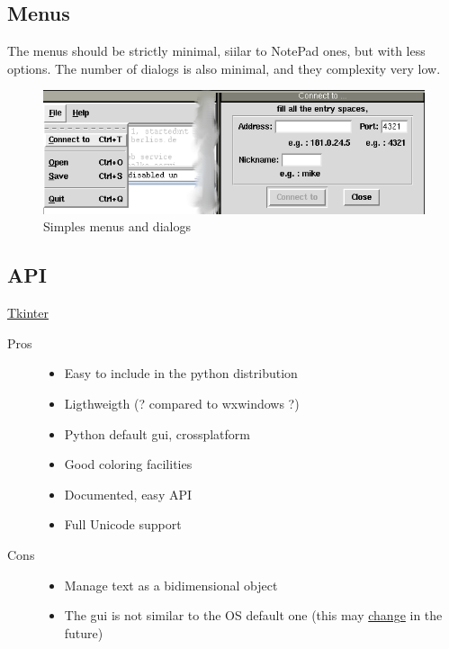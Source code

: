 \documentclass{article}
\begin{document}
\subsection{Menus}

The menus should be strictly minimal, siilar to NotePad ones, but with less options.
The number of dialogs is also minimal, and they complexity very low.


\begin{figure}[htbp]
 \begin{center}
    \includegraphics[angle=0,width=0.5\linewidth]{schemas/simples_menus_and_dialogs.png}
 \end{center}
 \label{fig:simplesmenusanddialogs}
 \caption{Simples menus and dialogs}
\end{figure}


\subsection{API}

\href{http://www.python.org/topics/tkinter/}{Tkinter}

\begin{description}
\item [Pros]
    \begin{itemize}
    \item Easy to include in the python distribution
    \item Ligthweigth (? compared to wxwindows ?)
    \item Python default gui, crossplatform
    \item Good coloring facilities
    \item Documented, easy API
    \item Full Unicode support
    \end{itemize}

\item [Cons]
    \begin{itemize}
    \item Manage text as a bidimensional object
    \item The gui is not similar to the OS default one (this may \href{http://tcl.projectforum.com/tk/47}{change} in the future)
    \end{itemize}
\end{description}

\end{document}
